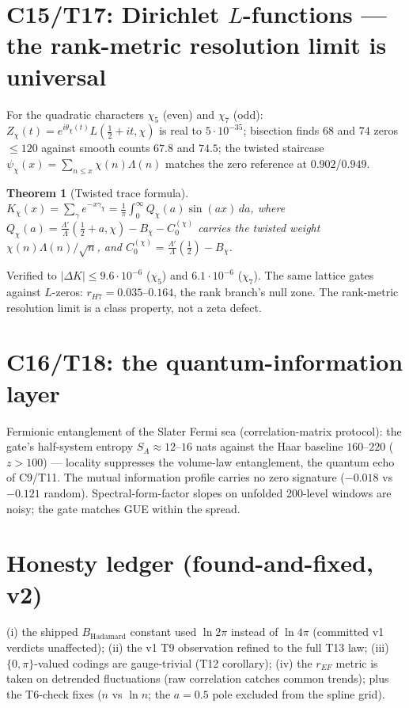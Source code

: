 \documentclass[11pt]{article}
\newtheorem{theorem}{Theorem}
\theoremstyle{definition}
\begin{document}
\section{C15/T17: Dirichlet $L$-functions — the rank-metric resolution limit is universal}
For the quadratic characters $\chi_5$ (even) and $\chi_7$ (odd):
$Z_\chi(t) = e^{i\theta_\chi(t)}L(\tfrac12{+}it,\chi)$ is real to
$5\cdot10^{-35}$; bisection finds $68$ and $74$ zeros $\le 120$ against
smooth counts $67.8$ and $74.5$; the twisted staircase
$\psi_\chi(x) = \sum_{n\le x}\chi(n)\Lambda(n)$ matches the zero reference
at $0.902$/$0.949$.
\begin{theorem}[Twisted trace formula]
$K_\chi(x) = \sum_\gamma e^{-x\gamma_\chi} = \frac{1}{\pi}\int_0^\infty
Q_\chi(a)\sin(ax)\,da$, where $Q_\chi(a) = \frac{\Lambda'}{\Lambda}
(\tfrac12{+}a,\chi) - B_\chi - C_0^{(\chi)}$ carries the twisted weight
$\chi(n)\Lambda(n)/\sqrt{n}$, and $C_0^{(\chi)} =
\frac{\Lambda'}{\Lambda}(\tfrac12) - B_\chi$.
\end{theorem}
Verified to $|\Delta K| \le 9.6\cdot10^{-6}$ ($\chi_5$) and
$6.1\cdot10^{-6}$ ($\chi_7$). The same lattice gates against $L$-zeros:
$r_{H7} = 0.035$--$0.164$, the rank branch's null zone. The rank-metric
resolution limit is a class property, not a zeta defect.

\section{C16/T18: the quantum-information layer}
Fermionic entanglement of the Slater Fermi sea (correlation-matrix
protocol): the gate's half-system entropy $S_A \approx 12$--$16$ nats
against the Haar baseline $160$--$220$ ($z>100$) --- locality suppresses
the volume-law entanglement, the quantum echo of C9/T11. The mutual
information profile carries no zero signature ($-0.018$ vs $-0.121$
random). Spectral-form-factor slopes on unfolded 200-level windows are
noisy; the gate matches GUE within the spread.

\section{Honesty ledger (found-and-fixed, v2)}
(i) the shipped $B_{\mathrm{Hadamard}}$ constant used $\ln 2\pi$ instead
of $\ln 4\pi$ (committed v1 verdicts unaffected);
(ii) the v1 T9 observation refined to the full T13 law;
(iii) $\{0,\pi\}$-valued codings are gauge-trivial (T12 corollary);
(iv) the $r_{EF}$ metric is taken on detrended fluctuations (raw
correlation catches common trends); plus the T6-check fixes ($n$ vs
$\ln n$; the $a=0.5$ pole excluded from the spline grid).
\end{document}
